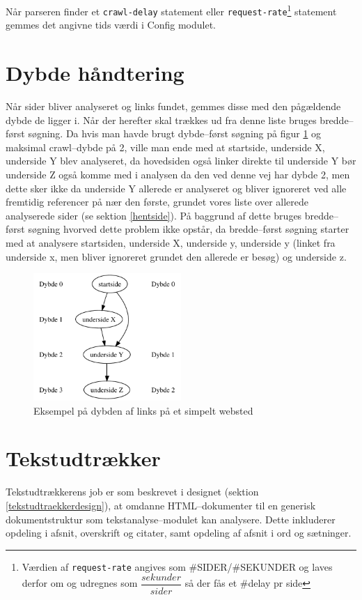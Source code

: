 \documentclass[a4paper,oneside]{memoir}
\begin{document}
Når parseren finder et \texttt{crawl-delay} statement eller 
\texttt{request-rate}\footnote{Værdien af \texttt{request-rate}
angives som \#SIDER/\#SEKUNDER og laves derfor om og udregnes som
$\dfrac{sekunder}{sider}$ så der fås et \#delay pr side} statement
gemmes det angivne tids værdi i Config modulet.

\section{Dybde håndtering}

Når sider bliver analyseret og links fundet, gemmes disse med den
pågældende dybde de ligger i. Når der herefter skal trækkes ud fra
denne liste bruges bredde--først søgning. Da hvis man havde brugt
dybde--først søgning på figur \ref{depthtree} og maksimal crawl--dybde
på 2, ville man ende med at startside, underside X, underside Y blev
analyseret, da hovedsiden også linker direkte til underside Y bør
underside Z også komme med i analysen da den ved denne vej har dybde
2, men dette sker ikke da underside Y allerede er analyseret og bliver
ignoreret ved alle fremtidig referencer på nær den første, grundet
vores liste over allerede analyserede sider (se sektion \ref{hentside}).
På baggrund af dette bruges bredde--først søgning hvorved dette problem
ikke opstår, da bredde--først søgning starter med at analysere startsiden,
underside X, underside y, underside y (linket fra underside x, men bliver
ignoreret grundet den allerede er besøg) og underside z.

\begin{figure}[h]
  \centering
  \includegraphics[width=0.5\textwidth]{depthtreeill.pdf}
  \caption{Eksempel på dybden af links på et simpelt websted}
  \label{depthtree}
\end{figure}

\section{Tekstudtrækker}
Tekstudtrækkerens job er som beskrevet i designet (sektion
\ref{tekstudtraekkerdesign}), at omdanne HTML--do\-ku\-men\-ter til en
generisk dokumentstruktur som tekstanalyse--modulet kan
analysere. Dette inkluderer opdeling i afsnit, overskrift og citater,
samt opdeling af afsnit i ord og sætninger.
\end{document}
